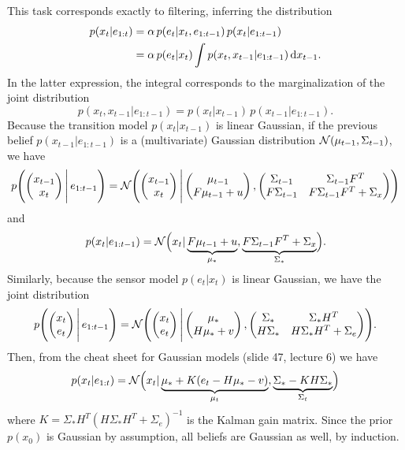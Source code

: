 \documentclass[11pt, a4paper]{article}
\begin{document}
\begin{enumerate}
    \begin{solution}
        This task corresponds exactly to filtering, \ie{} inferring the distribution
        \begin{align*}
            p(x_t | e_{1:t}) & = \alpha \, p(e_t | x_t, e_{1:t-1}) \, p(x_t | e_{1:t-1}) \\
            & = \alpha \, p(e_t | x_t) \int p(x_t, x_{t-1} | e_{1:t-1}) \d{x_{t-1}} .
        \end{align*}
        In the latter expression, the integral corresponds to the marginalization of the joint distribution
        \begin{equation*}
            p(x_t, x_{t-1} | e_{1:t-1}) = p(x_t | x_{t-1}) \, p(x_{t-1} | e_{1:t-1}) .
        \end{equation*}
        Because the transition model $p(x_t | x_{t-1})$ is linear Gaussian, if the previous belief $p(x_{t-1} | e_{1:t-1})$ is a (multivariate) Gaussian distribution $\N(\mu_{t-1}, \Sigma_{t-1})$, we have
        \begin{equation*}
            p\rbk*{ \mat{x_{t-1} \\ x_t} \Bigg| \, e_{1:t-1} } = \N\rbk*{ \mat{x_{t-1} \\ x_t} \Bigg| \mat{\mu_{t-1} \\ F \mu_{t-1} + u}, \mat{ \Sigma_{t-1} & \Sigma_{t-1} F^T \\ F \Sigma_{t-1} & F \Sigma_{t-1} F^T + \Sigma_x } }
        \end{equation*}
        and
        \begin{equation*}
            p(x_t | e_{1:t-1}) = \N\rbk[\Big]{x_t | \underbrace{F \mu_{t-1} + u}_{\mu_*}, \underbrace{F \Sigma_{t-1} F^T + \Sigma_x}_{\Sigma_*} } .
        \end{equation*}
        Similarly, because the sensor model $p(e_t | x_t)$ is linear Gaussian, we have the joint distribution
        \begin{equation*}
            p\rbk*{ \mat{x_t \\ e_t} \Bigg| \, e_{1:t-1} } = \N\rbk*{ \mat{x_t \\ e_t} \Bigg| \mat{\mu_* \\ H \mu_* + v}, \mat{ \Sigma_* & \Sigma_* H^T \\ H \Sigma_* & H \Sigma_* H^T + \Sigma_e } }.
        \end{equation*}
        Then, from the cheat sheet for Gaussian models (slide 47, lecture 6) we have
        \begin{equation*}
            p(x_t | e_{1:t}) = \N\rbk[\Big]{x_t | \underbrace{\mu_* + K (e_t - H \mu_* - v)}_{\mu_t}, \underbrace{\Sigma_* - K H \Sigma_*}_{\Sigma_t} }
        \end{equation*}
        where $K = \Sigma_* H^T (H \Sigma_* H^T + \Sigma_e)^{-1}$ is the Kalman gain matrix. Since the prior $p(x_0)$ is Gaussian by assumption, all beliefs are Gaussian as well, by induction.
    \end{solution}


\end{enumerate}
\end{document}
